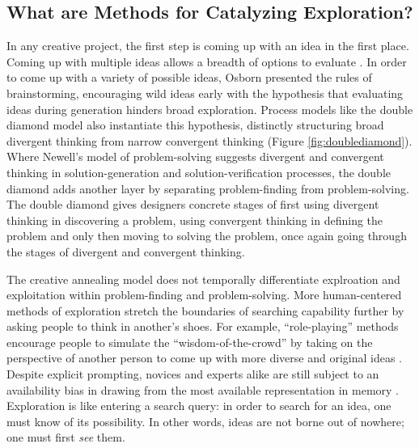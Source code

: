\subsection{What are Methods for Catalyzing Exploration?}
In any creative project, the first step is coming up with an idea in the first place. Coming up with multiple ideas allows a breadth of options to evaluate \cite{Kelley2013, osborn1953applied}. In order to come up with a variety of possible ideas, Osborn \cite{osborn1953applied} presented the rules of brainstorming, encouraging wild ideas early with the hypothesis that evaluating ideas during generation hinders broad exploration. Process models like the double diamond model \cite{doublediamond} also instantiate this hypothesis, distinctly structuring broad divergent thinking from narrow convergent thinking (Figure \ref{fig:doublediamond}). Where Newell's \cite{Newell1962processes} model of problem-solving suggests divergent and convergent thinking in solution-generation and solution-verification processes, the double diamond adds another layer by separating problem-finding from problem-solving. The double diamond gives designers concrete stages of first using divergent thinking in discovering a problem, using convergent thinking in defining the problem and only then moving to solving the problem, once again going through the stages of divergent and convergent thinking. 

The creative annealing model does not temporally differentiate explroation and exploitation within problem-finding and problem-solving. More human-centered methods of exploration stretch the boundaries of searching capability further by asking people to think in another's shoes. For example, ``role-playing'' methods encourage people to simulate the ``wisdom-of-the-crowd'' by taking on the perspective of another person to come up with more diverse and original ideas \cite{chou2020changing,chou2017finding, debono1985,teevan2017, vul2008measuring}. Despite explicit prompting, novices and experts alike are still subject to an availability bias in drawing from the most available representation in memory \cite{hinds2001, tversky1973availability}. Exploration is like entering a search query: in order to search for an idea, one must know of its possibility. In other words, ideas are not borne out of nowhere; one must first \textit{see} them.

